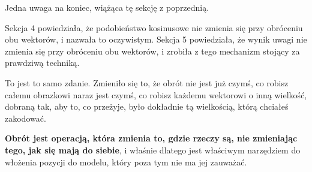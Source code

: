 \begin{fr}
Jedna uwaga na koniec, wiążąca tę sekcję z poprzednią.

Sekcja 4 powiedziała, że podobieństwo kosinusowe nie zmienia się przy
obróceniu obu wektorów, i nazwała to oczywistym. Sekcja 5 powiedziała, że
wynik uwagi nie zmienia się przy obróceniu obu wektorów, i zrobiła z tego
mechanizm stojący za prawdziwą techniką.

To jest to samo zdanie. Zmieniło się to, że obrót nie jest już czymś, co
robisz całemu obrazkowi naraz \dash{} jest czymś, co robisz każdemu wektorowi
o inną wielkość, dobraną tak, aby to, co przeżyje, było dokładnie tą
wielkością, którą chciałeś zakodować.

\textbf{Obrót jest operacją, która zmienia to, gdzie rzeczy są, nie zmieniając
tego, jak się mają do siebie}, i właśnie dlatego jest właściwym narzędziem do
włożenia pozycji do modelu, który poza tym nie ma jej zauważać.
\end{fr}

